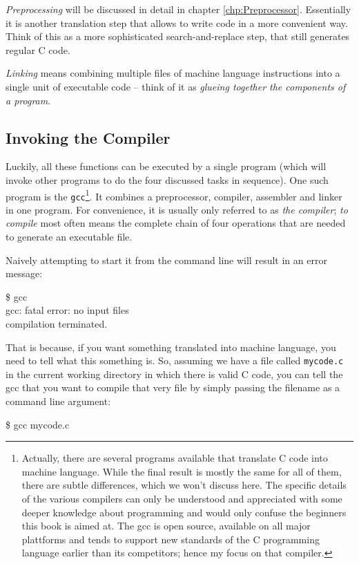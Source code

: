 \emph{Preprocessing} will be discussed in detail in chapter \ref{chp:Preprocessor}. Essentially it is another translation step that allows to write code in a more convenient way. Think of this as a more sophisticated search-and-replace step, that still generates regular C code.

\emph{Linking} means combining multiple files of machine language instructions into a single unit of executable code -- think of it as \emph{glueing together the components of a program}.

\subsection{Invoking the Compiler}
Luckily, all these functions can be executed by a single program (which will invoke other programs to do the four discussed tasks in sequence). One such program is the \texttt{gcc}\footnote{Actually, there are several programs available that translate C code into machine language. While the final result is mostly the same for all of them, there are subtle differences, which we won't discuss here. The specific details of the various compilers can only be understood and appreciated with some deeper knowledge about programming and would only confuse the beginners this book is aimed at. The gcc is open source, available on all major plattforms and tends to support new standards of the C programming language earlier than its competitors; hence my focus on that compiler.}. It combines a preprocessor, compiler, assembler and linker in one program. For convenience, it is usually only referred to as \emph{the compiler}; \emph{to compile} most often means the complete chain of four operations that are needed to generate an executable file.

Naively attempting to start it from the command line will result in an error message:
\begin{cmdbox}
\$ gcc\\
gcc: {\color{red}fatal error}: no input files\\
compilation terminated.
\end{cmdbox}

That is because, if you want something translated into machine language, you need to tell what this something is. So, assuming we have a file called \texttt{mycode.c} in the current working directory in which there is valid C code, you can tell the gcc that you want to compile that very file by simply passing the filename as a command line argument:
\begin{cmdbox}
\$ gcc mycode.c
\end{cmdbox}

